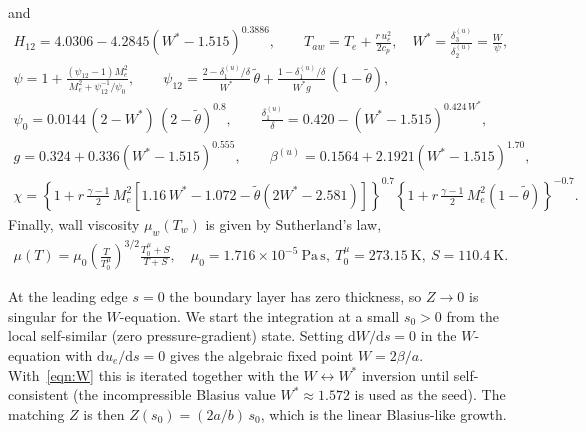 \documentclass[10pt,a4paper]{article}
\begin{document}
and
\begin{gather}
    H_{12} = 4.0306 - 4.2845\left(W^\ast - 1.515\right)^{0.3886},\qquad
    T_{aw} = T_e + \frac{r\,u_e^2}{2c_p},\quad
    W^\ast = \frac{\delta_3^{(u)}}{\delta_2^{(u)}} = \frac{W}{\psi},\label{eqn:W}\\[4pt]
    \psi = 1 + \frac{(\psi_{12}-1)M_e^2}
    {M_e^2 + \psi_{12}^{-1}/\psi_0},\qquad
    \psi_{12} =
    \frac{2-\delta_1^{(u)}/\delta}{W^\ast}\,\widetilde{\theta}
    +
    \frac{1-\delta_1^{(u)}/\delta}{W^\ast g}\,(1-\widetilde{\theta}),\\[4pt]
    \psi_0 = 0.0144\,(2-W^\ast)\,(2-\widetilde{\theta})^{0.8},\qquad
    \frac{\delta_1^{(u)}}{\delta}
    = 0.420 - \left(W^\ast - 1.515\right)^{0.424\,W^\ast},\\[4pt]
    g = 0.324 + 0.336\left(W^\ast - 1.515\right)^{0.555},\qquad
    \beta^{(u)} = 0.1564 + 2.1921\left(W^\ast - 1.515\right)^{1.70},\\[4pt]
    \chi =\left\{
    1 + r\,\frac{\gamma-1}{2}\,M_e^2
    \left[
    1.16\,W^\ast - 1.072 - \widetilde{\theta}(2W^\ast - 2.581)
    \right]
    \right\}^{0.7}
    \left\{
    1 + r\,\frac{\gamma-1}{2}\,M_e^2(1-\widetilde{\theta})
    \right\}^{-0.7}.
\end{gather}
Finally, wall viscosity $\mu_w(T_w)$ is given by Sutherland's law,
\begin{gather}
    \mu(T) = \mu_0\!\left(\frac{T}{T_0^{\mu}}\right)^{3/2}
              \frac{T_0^{\mu} + S}{T+S},
    \quad \mu_0 = 1.716\!\times\!10^{-5}\ \mathrm{Pa\,s},\
    T_0^{\mu}=273.15\ \mathrm{K},\ S=110.4\ \mathrm{K}.
\end{gather}

At the leading edge $s=0$ the boundary layer has zero thickness, so $Z\to 0$ is singular for the $W$-equation.  We start the integration at a small $s_0>0$ from the local self-similar (zero pressure-gradient) state. Setting $\mathrm{d}W/\mathrm{d}s=0$ in the $W$-equation with $\mathrm{d}u_e/\mathrm{d}s=0$ gives the algebraic fixed point $W = 2\beta/a$.  With~\cref{eqn:W} this is iterated together with the $W\!\leftrightarrow\!W^\ast$ inversion until self-consistent (the incompressible Blasius value $W^\ast \approx 1.572$ is used as the seed). The matching $Z$ is then $Z(s_0) = (2a/b)\,s_0$, which is the linear Blasius-like growth.
\end{document}
